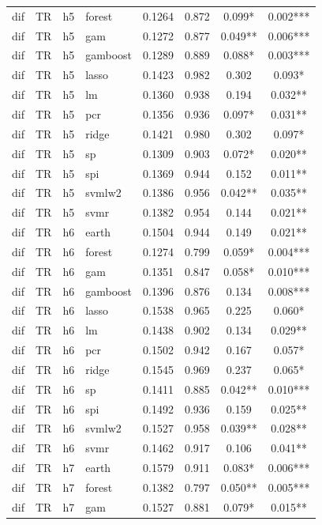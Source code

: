 \begin{ThreePartTable}
\begin{longtable}[t]{llclcccc}
dif & TR & h5 & forest & 0.1264 & 0.872 & 0.099* & 0.002***\\
dif & TR & h5 & gam & 0.1272 & 0.877 & 0.049** & 0.006***\\
dif & TR & h5 & gamboost & 0.1289 & 0.889 & 0.088* & 0.003***\\
dif & TR & h5 & lasso & 0.1423 & 0.982 & 0.302 & 0.093*\\
dif & TR & h5 & lm & 0.1360 & 0.938 & 0.194 & 0.032**\\
dif & TR & h5 & pcr & 0.1356 & 0.936 & 0.097* & 0.031**\\
dif & TR & h5 & ridge & 0.1421 & 0.980 & 0.302 & 0.097*\\
dif & TR & h5 & sp & 0.1309 & 0.903 & 0.072* & 0.020**\\
dif & TR & h5 & spi & 0.1369 & 0.944 & 0.152 & 0.011**\\
dif & TR & h5 & svmlw2 & 0.1386 & 0.956 & 0.042** & 0.035**\\
dif & TR & h5 & svmr & 0.1382 & 0.954 & 0.144 & 0.021**\\
\addlinespace
dif & TR & h6 & earth & 0.1504 & 0.944 & 0.149 & 0.021**\\
dif & TR & h6 & forest & 0.1274 & 0.799 & 0.059* & 0.004***\\
dif & TR & h6 & gam & 0.1351 & 0.847 & 0.058* & 0.010***\\
dif & TR & h6 & gamboost & 0.1396 & 0.876 & 0.134 & 0.008***\\
dif & TR & h6 & lasso & 0.1538 & 0.965 & 0.225 & 0.060*\\
dif & TR & h6 & lm & 0.1438 & 0.902 & 0.134 & 0.029**\\
dif & TR & h6 & pcr & 0.1502 & 0.942 & 0.167 & 0.057*\\
dif & TR & h6 & ridge & 0.1545 & 0.969 & 0.237 & 0.065*\\
dif & TR & h6 & sp & 0.1411 & 0.885 & 0.042** & 0.010***\\
dif & TR & h6 & spi & 0.1492 & 0.936 & 0.159 & 0.025**\\
dif & TR & h6 & svmlw2 & 0.1527 & 0.958 & 0.039** & 0.028**\\
dif & TR & h6 & svmr & 0.1462 & 0.917 & 0.106 & 0.041**\\
\addlinespace
dif & TR & h7 & earth & 0.1579 & 0.911 & 0.083* & 0.006***\\
dif & TR & h7 & forest & 0.1382 & 0.797 & 0.050** & 0.005***\\
dif & TR & h7 & gam & 0.1527 & 0.881 & 0.079* & 0.015**\\

\end{longtable}
\end{ThreePartTable}

